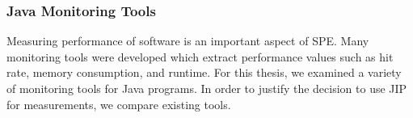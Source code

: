 





\subsubsection{Java Monitoring Tools}
\label{monitoring_tools}

Measuring performance of software is an important aspect of \ac{SPE}. Many monitoring tools were developed which extract performance values such as hit rate, memory consumption, and runtime. For this thesis, we examined a variety of monitoring tools for Java programs. In order to justify the decision to use \ac{JIP} for measurements, we compare existing tools.

